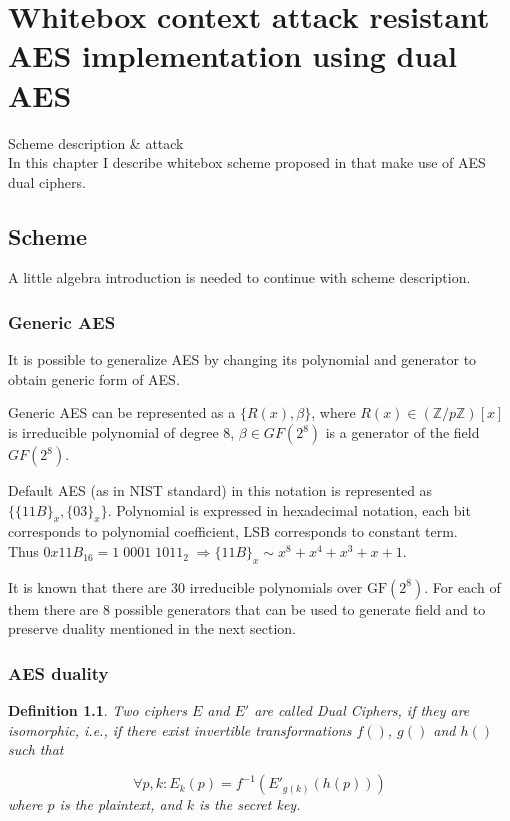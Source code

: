 \documentclass[11pt,oneside,final]{fithesis2}
\newtheorem{mydef}{Definition}
\begin{document}
\chapter{Whitebox context attack resistant AES implementation using dual AES}
    Scheme description \& attack\\
    In this chapter I describe whitebox scheme proposed in \citep{Karroumi:2010:PWA:2041036.2041060} that make use of AES dual ciphers.
    
    \section{Scheme}
    A little algebra introduction is needed to continue with scheme description.

	\subsection{Generic AES}
	It is possible to generalize AES by changing its polynomial and generator to obtain generic form of AES.

	Generic AES can be represented as a $\{R(x), \beta \}$, where $R(x) \in \left(\mathbb{Z}/p\mathbb{Z}\right)[x]$ is 
	irreducible polynomial of degree 8, $\beta \in GF(2^8)$ is a generator of the field $GF(2^8)$.

	Default AES (as in NIST standard) in this notation is represented as $\{\{11B\}_x, \{03\}_x\}$. Polynomial is expressed
	in hexadecimal notation, each bit corresponds to polynomial coefficient, LSB corresponds to constant term.\\
	Thus $0x11B_{16} = 1 \; 0001 \; 1011_{2} \; \Rightarrow \{11B\}_x \sim x^8+x^4+x^3+x+1$.

	It is known that there are $30$ irreducible polynomials over $\text{GF}(2^8)$. For each of them there are $8$ possible
	generators that can be used to generate field and to preserve duality mentioned in the next section.

	\subsection{AES duality}

	\begin{mydef}
	Two ciphers $E$ and $E'$ are called Dual Ciphers, if they are
	isomorphic, i.e., if there exist invertible transformations $f()$, $g()$ and $h()$ such
	that

	\begin{equation} 
	\forall p, k: E_k(p) = f^{-1}\left(E'_{g(k)}(h(p))\right)
	\end{equation}
	where $p$ is the plaintext, and $k$ is the secret key.
	\end{mydef}
\end{document}

